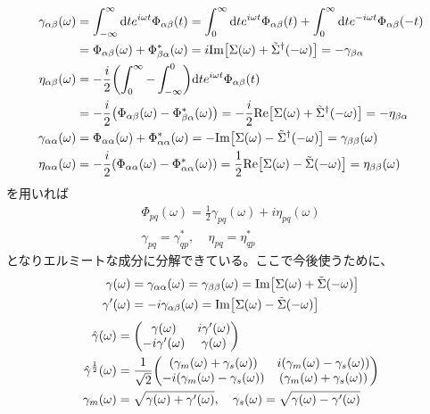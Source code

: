 \documentclass[dvipdfmx,autodetect-engine]{jsarticle}
\newcommand{\da}{\dagger}
\newcommand{\mr}[1]{\mathrm{#1}}
\begin{document}
\begin{align}
    \gamma_{\alpha\beta}(\omega) &= \int_{-\infty}^\infty \mr{d}t e^{i\omega t} \Phi_{\alpha\beta}(t) = \int_{0}^\infty \mr{d}t e^{i\omega t} \Phi_{\alpha\beta}(t) + \int_{0}^\infty \mr{d}t e^{-i\omega t} \Phi_{\alpha\beta}(-t)\\
    &= \Phi_{\alpha\beta}(\omega) + \Phi_{\beta\alpha}^*(\omega) = i\mr{Im}\qty[\Sigma(\omega)+ \tilde{\Sigma}^{\da}(-\omega)] = -\gamma_{\beta\alpha}\\
    \eta_{\alpha\beta}(\omega) &= -\frac{i}{2}\qty(\int_{0}^\infty-\int_{-\infty}^0)\mr{d}t e^{i\omega t} \Phi_{\alpha\beta}(t)\\
    &= -\frac{i}{2}\qty(\Phi_{\alpha\beta}(\omega) - \Phi_{\beta\alpha}^*(\omega)) = -\frac{i}{2} \mr{Re}\qty[\Sigma(\omega)+ \tilde{\Sigma}^{\da}(-\omega)] = -\eta_{\beta\alpha}\\
    \gamma_{\alpha\alpha}(\omega) &=  \Phi_{\alpha\alpha}(\omega) + \Phi_{\alpha\alpha}^*(\omega) = -\mr{Im}\qty[\Sigma(\omega) - \tilde{\Sigma}^\da(-\omega)] = \gamma_{\beta\beta}(\omega)\\
    \eta_{\alpha\alpha}(\omega)&= -\frac{i}{2}\qty(\Phi_{\alpha\alpha}(\omega) - \Phi_{\alpha\alpha}^*(\omega)) = \frac{1}{2}\mr{Re}\qty[\Sigma(\omega) - \tilde{\Sigma}(-\omega)] = \eta_{\beta\beta}(\omega)
\end{align}
を用いれば
\begin{align}
    \Phi_{pq}(\omega) = \frac{1}{2}\gamma_{pq}(\omega) + i \eta_{pq}(\omega)\\
    \gamma_{pq} = \gamma^*_{qp}, \ \ \ \ \ \eta_{pq} = \eta_{qp}^*
\end{align}
となりエルミートな成分に分解できている。ここで今後使うために、
\begin{align}
    \gamma(\omega) &= \gamma_{\alpha\alpha}(\omega) = \gamma_{\beta\beta}(\omega) = \mr{Im}\qty[\Sigma(\omega)+\tilde{\Sigma}(-\omega)]\\
    \gamma'(\omega) &= -i\gamma_{\alpha\beta}(\omega) = \mr{Im}\qty[\Sigma(\omega)-\tilde{\Sigma}(-\omega)]
\end{align}
\begin{align}
    \hat{\gamma}(\omega) &= \mqty(\gamma(\omega) & i\gamma'(\omega)\\ -i\gamma'(\omega) & \gamma(\omega))\\
    \hat{\gamma}^{\frac{1}{2}}(\omega) &= \frac{1}{\sqrt{2}}\mqty((\gamma_m(\omega)+\gamma_s(\omega)) & i(\gamma_m(\omega)-\gamma_s(\omega)) \\ -i(\gamma_m(\omega)-\gamma_s(\omega)) & (\gamma_m(\omega)+\gamma_s(\omega)))\\
    \gamma_m(\omega) &= \sqrt{\gamma(\omega) + \gamma'(\omega)}, \ \ \ \gamma_s(\omega) = \sqrt{\gamma(\omega) - \gamma'(\omega)}
\end{align}
\end{document}
